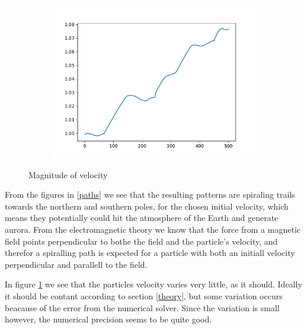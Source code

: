 \documentclass{article}
\begin{document}
\begin{figure}
    \begin{subfigure}{0.5\textwidth}
        \includegraphics[width=\linewidth]{./media/velocity.pdf}
    \end{subfigure}
    \caption{Magnitude of velocity}
    \label{velocity}
\end{figure}

\noindent
From the figures in \ref{paths} we see that the resulting patterns are spiraling trails towards the northern and southern poles, for the chosen initial velocity, which means they potentially could hit the atmosphere of the Earth and generate aurora. From the electromagnetic theory we know that the force from a magnetic field points perpendicular to bothe the field and the particle's velocity, and therefor a spiralling path is expected for a particle with both an initiall velocity
perpendicular and parallell to the field.

In figure \ref{velocity} we see that the particles velocity varies very little, as it should. Ideally it should be contant according to section \ref{theory}, but some variation occurs beacause of the error from the numerical solver. Since the variation is small however, the numerical precision seems to be quite good.
\end{document}
